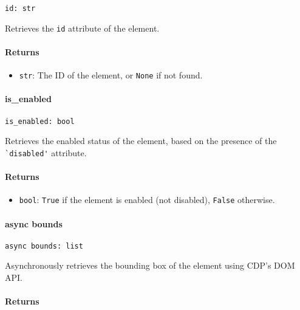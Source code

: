 \documentclass{article}
\begin{document}
\begin{lstlisting}[style=pythonstyle]
id: str
\end{lstlisting}

\noindent Retrieves the \lstinline[style=pythonstyle]|id| attribute of the element.

\paragraph{Returns}

\begin{itemize}
    \item \lstinline[style=pythonstyle]|str|: The ID of the element, or \lstinline[style=pythonstyle]|None| if not found.
\end{itemize}

\paragraph{is\_enabled}

\begin{lstlisting}[style=pythonstyle]
is_enabled: bool
\end{lstlisting}

\noindent Retrieves the enabled status of the element, based on the presence of the \lstinline[style=pythonstyle]|`disabled'| attribute.

\paragraph{Returns}

\begin{itemize}
    \item \lstinline[style=pythonstyle]|bool|: \lstinline[style=pythonstyle]|True| if the element is enabled (not disabled), \lstinline[style=pythonstyle]|False| otherwise.
\end{itemize}

\paragraph{async bounds}

\begin{lstlisting}[style=pythonstyle]
async bounds: list
\end{lstlisting}

\noindent Asynchronously retrieves the bounding box of the element using CDP's DOM API.

\paragraph{Returns}
\end{document}
